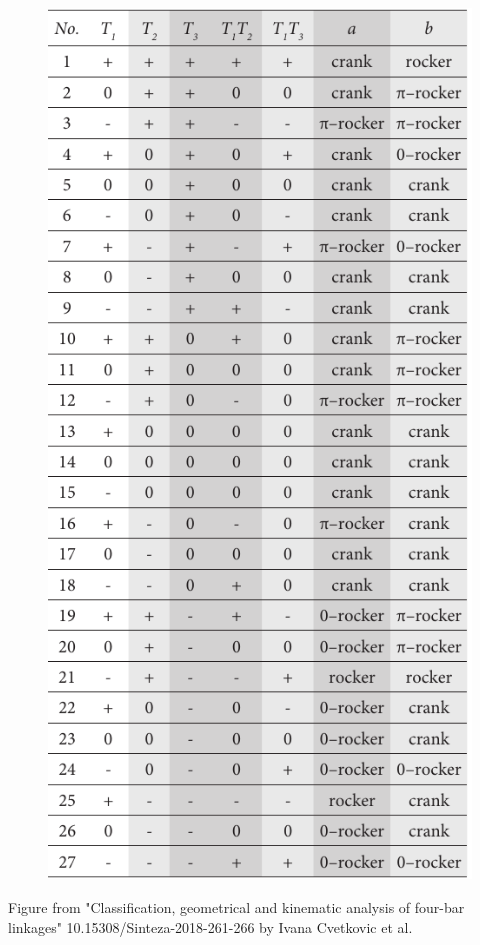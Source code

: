 \documentclass[ucs,10pt]{beamer}
\begin{document}
\begin{frame}
\begin{minipage}{\linewidth}
\begin{minipage}{0.31\linewidth}
\begin{figure}[h]
				\includegraphics[width=\textwidth]{./Figures/motion_classification.pdf}
			\end{figure}
		\end{minipage}
	\end{minipage}
	{\tiny Figure from "Classification, geometrical and kinematic analysis of four-bar linkages" 10.15308/Sinteza-2018-261-266 by Ivana Cvetkovic et al.}
\end{frame}
\end{document}
